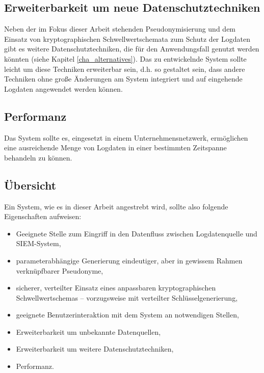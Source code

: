 \subsection{Erweiterbarkeit um neue Datenschutztechniken}

\label{subsec_impl_requirements_plugins}

Neben der im Fokus dieser Arbeit stehenden Pseudonymisierung und dem Einsatz von kryptographischen Schwellwertschemata zum Schutz der Logdaten gibt es weitere Datenschutztechniken, die für den Anwendungsfall genutzt werden könnten (siehe Kapitel \ref{cha_alternatives}). Das zu entwickelnde System sollte leicht um diese Techniken erweiterbar sein, d.h. so gestaltet sein, dass andere Techniken ohne große Änderungen am System integriert und auf eingehende Logdaten angewendet werden können.

\subsection{Performanz}

Das System sollte es, eingesetzt in einem Unternehmensnetzwerk, ermöglichen eine ausreichende Menge von Logdaten in einer bestimmten Zeitspanne behandeln zu können. 

\subsection{Übersicht}

Ein System, wie es in dieser Arbeit angestrebt wird, sollte also folgende Eigenschaften aufweisen:

\begin{itemize}
  \item Geeignete Stelle zum Eingriff in den Datenfluss zwischen Logdatenquelle und SIEM-System,
  \item parameterabhängige Generierung eindeutiger, aber in gewissem Rahmen verknüpfbarer Pseudonyme,
  \item sicherer, verteilter Einsatz eines anpassbaren kryptographischen Schwellwertschemas -- vorzugsweise mit verteilter Schlüsselgenerierung,
  \item geeignete Benutzerinteraktion mit dem System an notwendigen Stellen,
  \item Erweiterbarkeit um unbekannte Datenquellen,
  \item Erweiterbarkeit um weitere Datenschutztechniken,
  \item Performanz.
\end{itemize}
